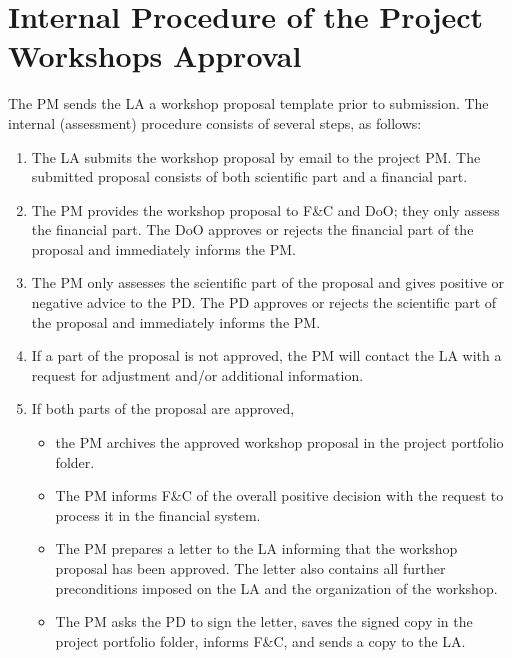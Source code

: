 
\section{Internal Procedure of the Project Workshops Approval}
\label{app:workshop}

The PM sends the LA a workshop proposal template prior to submission. The internal (assessment) procedure consists of
several steps, as follows:
\begin{enumerate}
\item The LA submits the workshop proposal by email to the project PM. The submitted proposal consists of both scientific part
and a financial part.
\item The PM provides the workshop proposal to F\&C and DoO; they only assess the financial part. The DoO approves or rejects
the financial part of the proposal and immediately informs the PM.
\item The PM only assesses the scientific part of the proposal and gives positive or negative advice to the PD. The PD
approves or rejects the scientific part of the proposal and immediately informs the PM.
\item If a part of the proposal is not approved, the PM will contact the LA with a request for adjustment and/or additional
information.
\item If both parts of the proposal are approved,
\begin{itemize}
\item the PM archives the approved workshop proposal in the project portfolio folder.
\item The PM informs F\&C of the overall positive decision with the request to process it in the financial system.
\item The PM prepares a letter to the LA informing that the workshop proposal has been approved. The letter also contains all
further preconditions imposed on the LA and the organization of the workshop.
\item The PM asks the PD to sign the letter, saves the signed copy in the project portfolio folder, informs F\&C, and sends a
copy to the LA.
\end{itemize}
\end{enumerate}